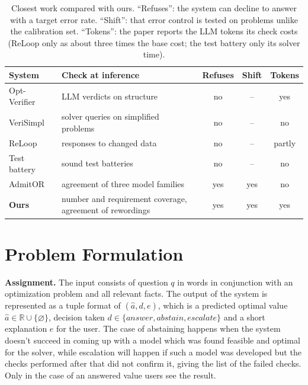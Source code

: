 \documentclass[conference]{IEEEtran}
\begin{document}
\begin{table}[t]
\centering
\caption{Closest work compared with ours. ``Refuses'': the system can decline to answer with a target error rate.
``Shift'': that error control is tested on problems unlike the calibration set. ``Tokens'': the paper reports the LLM tokens its check costs (ReLoop only as about three times the base cost; the test battery only its solver time).}
\label{tab:related}
\footnotesize
\setlength{\tabcolsep}{3pt}
\begin{tabular}{@{}>{\raggedright\arraybackslash}p{2.05cm}>{\raggedright\arraybackslash}p{2.55cm}ccc@{}}
\toprule
\textbf{System} & \textbf{Check at inference} & \textbf{Refuses} & \textbf{Shift} & \textbf{Tokens} \\
\midrule
Opt-Verifier~\cite{liu2026optverifier} & LLM verdicts on structure & no & -- & yes \\
VeriSimpl~\cite{abdulrahman2026verisimpl} & solver queries on simplified problems & no & -- & no \\
ReLoop~\cite{lian2026reloop} & responses to changed data & no & -- & partly \\
Test battery~\cite{li2026falsification} & sound test batteries & no & -- & no \\
AdmitOR~\cite{lian2026admitor} & agreement of three model families & yes & yes & no \\
\textbf{Ours} & number and requirement coverage, agreement of rewordings & yes & yes & yes \\
\bottomrule
\end{tabular}
\end{table}

\section{Problem Formulation}
\label{sec:problem}

\textbf{Assignment.} The input consists of question $q$ in words in conjunction with an optimization problem and all
relevant facts. The output of the system is represented as a tuple format of $(\hat{a}, d, e)$, which is a predicted
optimal value $\hat{a} \in \mathbb{R} \cup \{\varnothing\}$, decision taken $d \in \{\textit{answer}, \textit{abstain},
\textit{escalate}\}$ and a short explanation $e$ for the user. The case of abstaining happens when the system doesn't
succeed in coming up with a model which was found feasible and optimal for the solver, while escalation will happen if
such a model was developed but the checks performed after that did not confirm it, giving the list of the failed
checks. Only in the case of an answered value users see the result.
\end{document}
